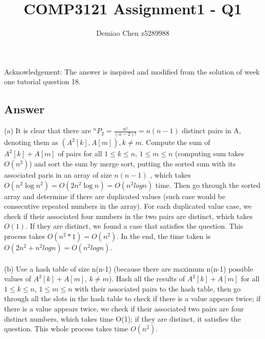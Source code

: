 \documentclass[12pt]{article}
\title{COMP3121 Assignment1 - Q1}
\author{Demiao Chen z5289988}
\newcommand*{\Perm}[2]{{}^{#1}\!P_{#2}}%
\begin{document}
\maketitle

Acknowledgement: The answer is inspired and modified from the solution of week one tutorial question 18.

\subsection*{Answer}
(a) It is clear that there are $\Perm{n}{2}=\frac{n!}{(n-2)!} = n(n-1)$ distinct pairs in A, denoting them as  $(A^2[k], A[m]), k\ne m$. Compute the sum of $A^2[k] + A[m]$ of pairs for all $1 \leq k \leq n$, $1 \leq m \leq n$ (computing sum takes $O(n^2)$)
and sort the sum by merge sort, putting the sorted sum with its associated paris in an array of size $n(n-1)$
, which takes $O(n^2\log{n^2}) = O(2n^2\log{n}) = O(n^2log{n})$ time.
Then go through the sorted array and determine if there are duplicated values (such case would be consecutive repeated numbers in the array).
For each duplicated value case, we check if their associated four numbers in the two pairs are distinct,
which takes $O(1)$. If they are distinct, we found a case that satisfies the question. This 
process takes $O(n^2 * 1) = O(n^2)$.
In the end, the time taken is $O(2n^2 + n^2logn) = O(n^2logn)$.
\\\\
(b) Use a hash table of size n(n-1) (because there are maximum n(n-1) 
possible values of $A^2[k] + A[m]$, $k \ne m$). Hash all the results of 
$A^2[k] + A[m]$ for all $1 \leq k \leq n$, $1 \leq m \leq n$ with their 
associated pairs to the hash table, 
then go through all the slots in the hash table to check if there is a value 
appears twice; if there is a value appears twice, we check if their associated two
pairs are four distinct numbers, which takes time O(1); if they are distinct, it satisfies the question. This whole
process takes time $O(n^2)$.
\end{document}
